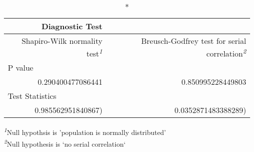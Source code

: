 \setlength{\LTpost}{0mm}
\begin{longtable}{rr}
\caption*{
{\large Diagnostic Test}
} \\ 
\toprule
Shapiro-Wilk normality test\textsuperscript{\textit{1}} & Breusch-Godfrey test for serial correlation\textsuperscript{\textit{2}} \\ 
\midrule
\multicolumn{2}{l}{P value} \\ 
\midrule
0.290400477086441 & 0.850995228449803 \\ 
\midrule
\multicolumn{2}{l}{Test Statistics} \\ 
0.985562951840867) & 0.0352871483388289) \\ 
\bottomrule
\end{longtable}
\begin{minipage}{\linewidth}
\textsuperscript{\textit{1}}Null hypothsis is 'population is normally distributed'\\
\textsuperscript{\textit{2}}Null hypothesis is `no serial correlation`\\
\end{minipage}

